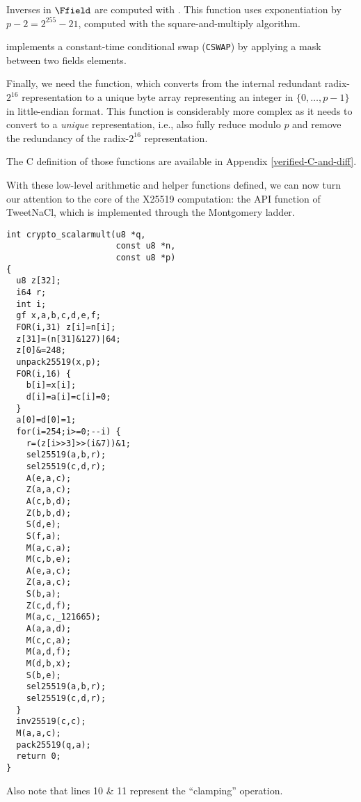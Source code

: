 Inverses in $\Ffield$ are computed with .
This function uses exponentiation by $p - 2 = 2^{255}-21$,
computed with the square-and-multiply algorithm.

 implements a constant-time conditional swap (\texttt{CSWAP}) by
applying a mask between two fields elements.

Finally, we need the  function,
which converts from the internal redundant radix-$2^{16}$
representation to a unique byte array representing an
integer in $\{0,\dots,p-1\}$ in little-endian format.
This function is considerably more complex as it needs to convert
to a \emph{unique} representation, i.e., also fully reduce modulo
$p$ and remove the redundancy of the radix-$2^{16}$ representation.

The C definition of those functions are available in
Appendix \ref{verified-C-and-diff}.

With these low-level arithmetic and helper functions defined,
we can now turn our attention to the core of the X25519 computation:
the  API function of TweetNaCl,
which is implemented through the Montgomery ladder.

\begin{lstlisting}[language=Ctweetnacl]
int crypto_scalarmult(u8 *q,
                      const u8 *n,
                      const u8 *p)
{
  u8 z[32];
  i64 r;
  int i;
  gf x,a,b,c,d,e,f;
  FOR(i,31) z[i]=n[i];
  z[31]=(n[31]&127)|64;
  z[0]&=248;
  unpack25519(x,p);
  FOR(i,16) {
    b[i]=x[i];
    d[i]=a[i]=c[i]=0;
  }
  a[0]=d[0]=1;
  for(i=254;i>=0;--i) {
    r=(z[i>>3]>>(i&7))&1;
    sel25519(a,b,r);
    sel25519(c,d,r);
    A(e,a,c);
    Z(a,a,c);
    A(c,b,d);
    Z(b,b,d);
    S(d,e);
    S(f,a);
    M(a,c,a);
    M(c,b,e);
    A(e,a,c);
    Z(a,a,c);
    S(b,a);
    Z(c,d,f);
    M(a,c,_121665);
    A(a,a,d);
    M(c,c,a);
    M(a,d,f);
    M(d,b,x);
    S(b,e);
    sel25519(a,b,r);
    sel25519(c,d,r);
  }
  inv25519(c,c);
  M(a,a,c);
  pack25519(q,a);
  return 0;
}
\end{lstlisting}

Also note that lines 10 \& 11 represent the ``clamping'' operation.
